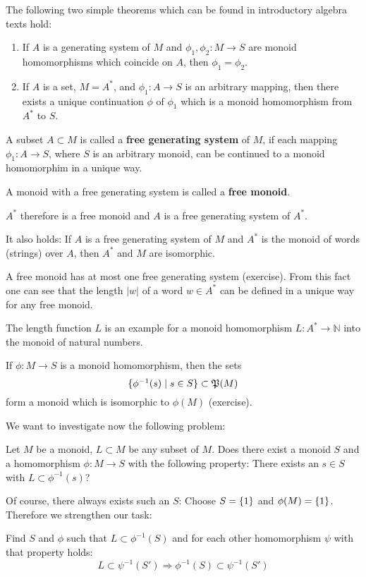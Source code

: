 The following two simple theorems which can be found in introductory algebra
texts hold:
\begin{enumerate}
  \item If $A$ is a generating system of $M$ and $\phi_1, \phi_2 : M \to S$ are
  monoid homomorphisms which coincide on $A$, then $\phi_1 = \phi_2$.
  \item If $A$ is a set, $M = A^*$, and $\phi_1 : A \to S$ is an arbitrary
  mapping, then there exists a unique continuation $\phi$ of $\phi_1$ which is
  a monoid homomorphism from $A^*$ to $S$.
\end{enumerate}

\begin{definition}
A subset $A \subset M$ is called a {\bf free generating system} of $M$, if each
mapping $\phi_1 : A \to S$, where $S$ is an arbitrary monoid, can be continued
to a monoid homomorphim in a unique way. 
\end{definition}

A monoid with a free generating system is called a {\bf free monoid}.

$A^*$ therefore is a free monoid and $A$ is a free generating system of $A^*$.

It also holds: If $A$ is a free generating system of $M$ and $A^*$ is the
monoid of words (strings) over $A$, then $A^*$ and $M$ are isomorphic.

A free monoid has at most one free generating system (exercise). From this fact
one can see that the length $|w|$ of a word $w \in A^*$ can be defined in a unique way for any
free monoid.

The length function $L$ is an example for a monoid homomorphism $L : A^* \to
\mathbb{N}$ into the monoid of natural numbers.

If $\phi : M \to S$ is a monoid homomorphism, then the sets 
\[ \mbox{$\{\phi^{-1}(s) \mid s \in S\}$} \subset \mathfrak{P}(M) \]
form a monoid which is isomorphic to $\phi(M)$ (exercise).

We want to investigate now the following problem:

Let $M$ be a monoid, $L \subset M$ be any subset of $M$. Does there exist a
monoid $S$ and a homomorphism $\phi : M \to S$ with the following property:
There exists an $s \in S$ with $L \subset \phi^{-1}(s)$?

Of course, there always exists such an $S$: Choose $S = \mbox{$\{1\}$}$ and
$\phi(M) = \mbox{$\{1\}$}$. Therefore we strengthen our task: 

Find $S$ and $\phi$ such that $L \subset \phi^{-1}(S)$ and for each other
homomorphism $\psi$ with that property holds:
\[ L \subset \psi^{-1}(S') \Rightarrow \phi^{-1}(S) \subset \psi^{-1}(S') \]


